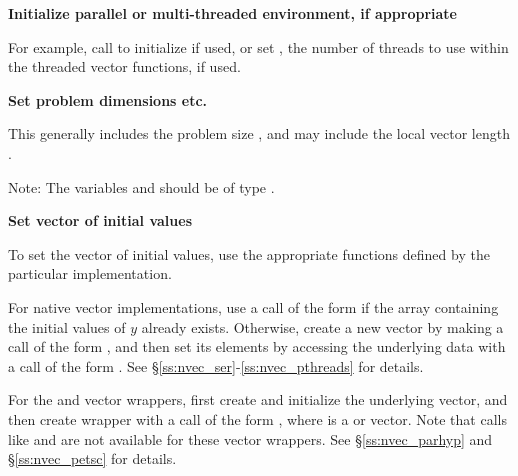 \begin{Steps}
  
\item 
  {\bf Initialize parallel or multi-threaded environment, if appropriate}

  For example, call  to initialize {\mpi} if used, or
  set , the number of threads to use within the threaded
  vector functions, if used.
 
\item
  {\bf Set problem dimensions etc.}

  This generally includes the problem size , and may include
  the local vector length .

  Note: The variables  and  should be of type .

\item
  {\bf Set vector of initial values}
 
  To set the vector  of initial values, use the appropriate
  functions defined by the particular {\nvector} implementation.

  For native {\sundials} vector implementations, use a call 
  of the form  if the  array 
   containing the initial values of $y$ already exists.
  Otherwise, create a new vector by making a call of the form
  , and then set its elements by accessing 
  the underlying data with a call of the form 
  .
  See \S\ref{ss:nvec_ser}-\ref{ss:nvec_pthreads} for details.
  
  For the {\hypre} and {\petsc} vector wrappers, first create and initialize 
  the underlying vector, and then create {\nvector} wrapper with a call 
  of the form , where  is a {\hypre}
  or {\petsc} vector. Note that calls like  and 
   are not available for these vector wrappers.
  See \S\ref{ss:nvec_parhyp} and \S\ref{ss:nvec_petsc} for details.
  


\end{Steps}
